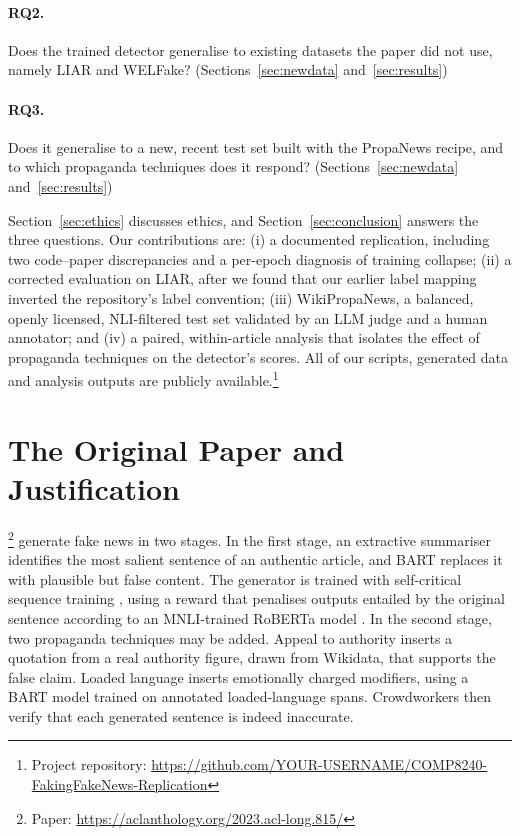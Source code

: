 \documentclass[11pt]{article}
\newcommand{\repourl}{https://github.com/YOUR-USERNAME/COMP8240-FakingFakeNews-Replication}
\begin{document}
\paragraph{RQ2.} Does the trained detector generalise to existing datasets the paper did not use, namely LIAR and WELFake? (Sections~\ref{sec:newdata} and~\ref{sec:results})

\paragraph{RQ3.} Does it generalise to a new, recent test set built with the PropaNews recipe, and to which propaganda techniques does it respond? (Sections~\ref{sec:newdata} and~\ref{sec:results})

\vspace{4pt}
Section~\ref{sec:ethics} discusses ethics, and Section~\ref{sec:conclusion} answers the three questions. Our contributions are: (i) a documented replication, including two code--paper discrepancies and a per-epoch diagnosis of training collapse; (ii) a corrected evaluation on LIAR, after we found that our earlier label mapping inverted the repository's label convention; (iii) WikiPropaNews, a balanced, openly licensed, NLI-filtered test set validated by an LLM judge and a human annotator; and (iv) a paired, within-article analysis that isolates the effect of propaganda techniques on the detector's scores. All of our scripts, generated data and analysis outputs are publicly available.\footnote{Project repository: \url{\repourl}}

\section{The Original Paper and Justification}
\label{sec:paper}

\citet{huang-etal-2023-faking}\footnote{Paper: \url{https://aclanthology.org/2023.acl-long.815/}} generate fake news in two stages. In the first stage, an extractive summariser identifies the most salient sentence of an authentic article, and BART replaces it with plausible but false content. The generator is trained with self-critical sequence training \citep{rennie2017selfcritical}, using a reward that penalises outputs entailed by the original sentence according to an MNLI-trained RoBERTa model \citep{williams2018mnli}. In the second stage, two propaganda techniques \citep{dasanmartino2019finegrained} may be added. Appeal to authority inserts a quotation from a real authority figure, drawn from Wikidata, that supports the false claim. Loaded language inserts emotionally charged modifiers, using a BART model trained on annotated loaded-language spans. Crowdworkers then verify that each generated sentence is indeed inaccurate.
\end{document}
